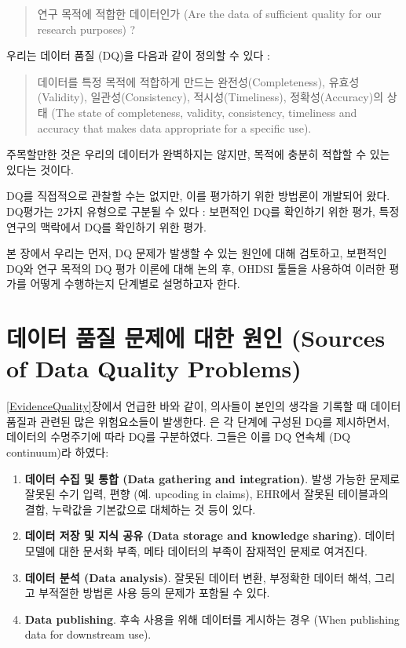 \documentclass[11pt]{book}
\providecommand{\tightlist}{%
  \setlength{\itemsep}{0pt}\setlength{\parskip}{0pt}}
\theoremstyle{definition}
\theoremstyle{definition}
\theoremstyle{definition}
\theoremstyle{remark}
\begin{document}
\begin{quote}
연구 목적에 적합한 데이터인가 (Are the data of sufficient quality for
our research purposes) ?
\end{quote}

우리는 데이터 품질 (DQ)을 다음과 같이 정의할 수 있다
\citep{roebuck_2012}: 

\begin{quote}
데이터를 특정 목적에 적합하게 만드는 완전성(Completeness),
유효성(Validity), 일관성(Consistency), 적시성(Timeliness),
정확성(Accuracy)의 상태 (The state of completeness, validity,
consistency, timeliness and accuracy that makes data appropriate for a
specific use).
\end{quote}

주목할만한 것은 우리의 데이터가 완벽하지는 않지만, 목적에 충분히 적합할
수 있는 있다는 것이다.

DQ를 직접적으로 관찰할 수는 없지만, 이를 평가하기 위한 방법론이 개발되어
왔다. DQ평가는 2가지 유형으로 구분될 수 있다 \citep{weiskopf_2013}:
보편적인 DQ를 확인하기 위한 평가, 특정 연구의 맥락에서 DQ를 확인하기
위한 평가.

본 장에서 우리는 먼저, DQ 문제가 발생할 수 있는 원인에 대해 검토하고,
보편적인 DQ와 연구 목적의 DQ 평가 이론에 대해 논의 후, OHDSI 툴들을
사용하여 이러한 평가를 어떻게 수행하는지 단계별로 설명하고자 한다.

\section{데이터 품질 문제에 대한 원인 (Sources of Data Quality
Problems)}\label{-----sources-of-data-quality-problems}

\ref{EvidenceQuality}장에서 언급한 바와 같이, 의사들이 본인의 생각을
기록할 때 데이터 품질과 관련된 많은 위험요소들이 발생한다.
\citet{dasu_2003} 은 각 단계에 구성된 DQ를 제시하면서, 데이터의
수명주기에 따라 DQ를 구분하였다. 그들은 이를 DQ 연속체 (DQ continuum)라
하였다:

\begin{enumerate}
\def\labelenumi{\arabic{enumi}.}
\tightlist
\item
  \textbf{데이터 수집 및 통합 (Data gathering and integration)}. 발생
  가능한 문제로 잘못된 수기 입력, 편향 (예. upcoding in claims), EHR에서
  잘못된 테이블과의 결합, 누락값을 기본값으로 대체하는 것 등이 있다.
\item
  \textbf{데이터 저장 및 지식 공유 (Data storage and knowledge
  sharing)}. 데이터 모델에 대한 문서화 부족, 메타 데이터의 부족이
  잠재적인 문제로 여겨진다.
\item
  \textbf{데이터 분석 (Data analysis)}. 잘못된 데이터 변환, 부정확한
  데이터 해석, 그리고 부적절한 방법론 사용 등의 문제가 포함될 수 있다.\\
\item
  \textbf{Data publishing}. 후속 사용을 위해 데이터를 게시하는 경우
  (When publishing data for downstream use).
\end{enumerate}
\end{document}
